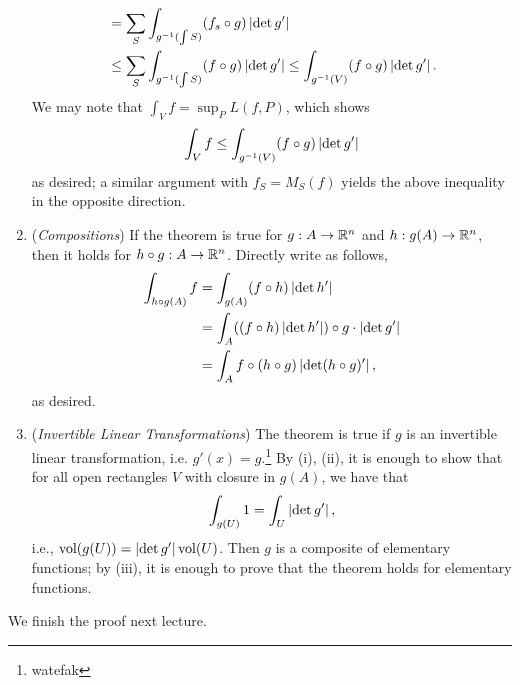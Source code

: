 \begin{enumerate}[label=(\roman*)]
\begin{align*}
        &= \sum_S \int_{g^{-1}(\int S)} (f_s \circ g) \left\lvert \det g' \right\rvert \\
        &\leq \sum_S \int_{g^{-1}(\int S)} (f \circ g) \left\lvert \det g' \right\rvert \leq \int_{g^{-1}(V)} (f \circ g) \left\lvert \det g' \right\rvert.
    \end{align*}
    We may note that $\int_V f = \sup_P L(f, P)$, which shows
    \[ \int_V f \leq \int_{g^{-1}(V)} (f \circ g) \left\lvert \det g' \right\rvert \]
    as desired; a similar argument with $f_S = M_S(f)$ yields the above inequality in the opposite direction.
    \item (\textit{Compositions}) If the theorem is true for $g : A \to \mathbb R^n$ and $h : g(A) \to \mathbb R^n$, then it holds for $h \circ g : A \to \mathbb R^n$. Directly write as follows,
    \begin{align*}
        \int_{h \circ g(A)} f &= \int_{g(A)} (f \circ h) \left\lvert \det h' \right\rvert \\
        &= \int_A ((f \circ h) \left\lvert \det h' \right\rvert) \circ g \cdot \left\lvert \det g' \right\rvert \\
        &= \int_A f \circ (h \circ g) \left\lvert \det (h \circ g)' \right\rvert,
    \end{align*}
    as desired.
    \item (\textit{Invertible Linear Transformations}) The theorem is true if $g$ is an invertible linear transformation, i.e. $g'(x) = g$.\footnote{watefak} By (i), (ii), it is enough to show that for all open rectangles $V$ with closure in $g(A)$, we have that
    \[ \int_{g(U)} 1 = \int_U \left\lvert \det g' \right\rvert, \]
    i.e., $\mathrm{vol}(g(U)) = \left\lvert \det g' \right\rvert \mathrm{vol}(U)$. Then $g$ is a composite of elementary functions; by (iii), it is enough to prove that the theorem holds for elementary functions.
\end{enumerate}
We finish the proof next lecture.